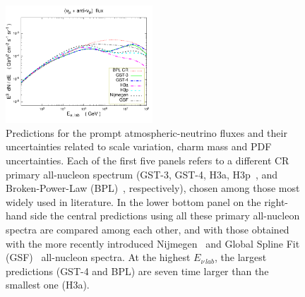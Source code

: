 \documentclass[12pt]{article}
\begin{document}
\begin{figure}
    \includegraphics[width=0.49\textwidth]{figs/numuantinumuflux_crfluxvar_spettro01234_pair1_prosa19.pdf}
  \caption{\label{fig1prompt}  Predictions for the prompt atmospheric-neutrino fluxes and their uncertainties related to scale variation, charm mass and PDF uncertainties. Each of the first five panels refers to a different CR primary all-nucleon spectrum (GST-3, GST-4, H3a, H3p~\cite{Gaisser:2013bla, Gaisser:2011cc},  and Broken-Power-Law (BPL)~\cite{Gaisser:2016uoy}, respectively), chosen among those most widely used in literature. In the lower bottom panel on the right-hand side the central predictions using all these primary all-nucleon spectra are compared among each other, and with those obtained with the more recently introduced Nijmegen~\cite{Thoudam:2016syr} and Global Spline Fit (GSF)~\cite{Dembinski:2017zsh,Schroeder:2019agg} all-nucleon spectra. At the highest $E_{\nu\, lab}$, the largest predictions (GST-4 and BPL) are seven time larger than the smallest one (H3a).}
\end{figure}


\end{document}
